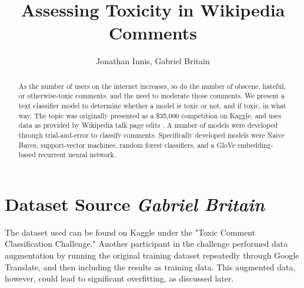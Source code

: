 \documentclass{article}
\title{Assessing Toxicity in Wikipedia Comments}
\author{Jonathan Innis, Gabriel Britain}
\date{}
\begin{document}
\begin{titlepage}
	\maketitle
	\tableofcontents{}
\end{titlepage}

\begin{abstract}
	As the number of users on the internet increases, so do the number of
	obscene, hateful, or otherwise-toxic comments, and the need to moderate
	those comments. We present a text classifier model to determine whether
	a model is toxic or not, and if toxic, in what way. The topic was
	originally presented as a \$35,000 competition on Kaggle, and uses data
	as provided by Wikipedia talk page edits
	\cite{Wulczyn:2017:EMP:3038912.3052591}. A number of models were
	developed through trial-and-error to classify comments. Specifically
	developed models were Naive Bayes, support-vector machines, random
	forest classifiers, and a GloVe embedding-based recurrent neural
	network.
\end{abstract}

\section{Dataset Source \textit{Gabriel Britain}}{
  The dataset used can be found on Kaggle under the "Toxic Comment
  Classification Challenge." Another participant in the challenge
  performed data augmentation by running the original training dataset
  repeatedly through Google Translate, and then including the results as
  training data. This augmented data, however, could lead to significant
  overfitting, as discussed later.
 }
\end{document}
